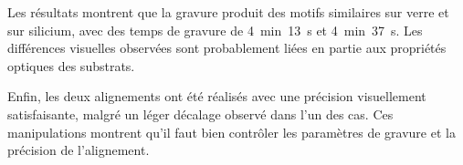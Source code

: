 Les résultats montrent que la gravure produit des motifs similaires sur verre et sur silicium, avec des temps de gravure de \qty{4}{\minute}~\qty{13}{\second} et \qty{4}{\minute}~\qty{37}{\second}. Les différences visuelles observées sont probablement liées en partie aux propriétés optiques des substrats.

Enfin, les deux alignements ont été réalisés avec une précision visuellement satisfaisante, malgré un léger décalage observé dans l'un des cas. Ces manipulations montrent qu'il faut bien contrôler les paramètres de gravure et la précision de l'alignement.



